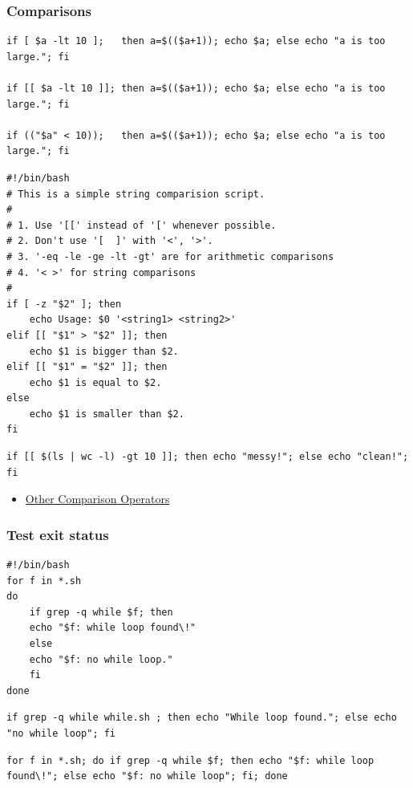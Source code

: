 \documentclass[12pt]{article}
\begin{document}
\subsubsection{Comparisons}
\label{sec-3-2-1}
\begin{verbatim}
if [ $a -lt 10 ];   then a=$(($a+1)); echo $a; else echo "a is too large."; fi

if [[ $a -lt 10 ]]; then a=$(($a+1)); echo $a; else echo "a is too large."; fi

if (("$a" < 10));   then a=$(($a+1)); echo $a; else echo "a is too large."; fi
\end{verbatim}
\begin{verbatim}
#!/bin/bash
# This is a simple string comparision script.
#
# 1. Use '[[' instead of '[' whenever possible.
# 2. Don't use '[  ]' with '<', '>'.
# 3. '-eq -le -ge -lt -gt' are for arithmetic comparisons
# 4. '< >' for string comparisons
#
if [ -z "$2" ]; then
    echo Usage: $0 '<string1> <string2>'
elif [[ "$1" > "$2" ]]; then
    echo $1 is bigger than $2.
elif [[ "$1" = "$2" ]]; then
    echo $1 is equal to $2.
else
    echo $1 is smaller than $2.
fi
\end{verbatim}
\begin{verbatim}
if [[ $(ls | wc -l) -gt 10 ]]; then echo "messy!"; else echo "clean!"; fi
\end{verbatim}
\begin{itemize}
\item \href{http://www.tldp.org/LDP/abs/html/comparison-ops.html}{Other Comparison Operators}
\end{itemize}
\subsubsection{Test exit status}
\label{sec-3-2-2}
\begin{verbatim}
#!/bin/bash
for f in *.sh
do
    if grep -q while $f; then
	echo "$f: while loop found\!"
    else
	echo "$f: no while loop."
    fi
done
\end{verbatim}
\begin{verbatim}
if grep -q while while.sh ; then echo "While loop found."; else echo "no while loop"; fi
\end{verbatim}
\begin{verbatim}
for f in *.sh; do if grep -q while $f; then echo "$f: while loop found\!"; else echo "$f: no while loop"; fi; done
\end{verbatim}
\end{document}
